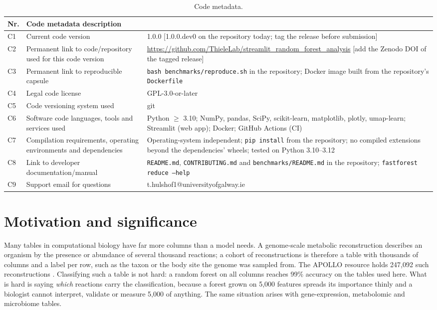 \documentclass[11pt,a4paper]{article}
\newcommand{\authnote}[1]{{\color{notecolor}\small [#1]}}
\begin{document}
\begin{table}[htbp]
\small
\caption{Code metadata.}
\label{tab:metadata}
\begin{tabular}{P{0.6cm}P{6.2cm}P{8.6cm}}
\toprule
\textbf{Nr.} & \textbf{Code metadata description} & \\
\midrule
C1 & Current code version & 1.0.0 \authnote{1.0.0.dev0 on the repository today; tag the release before submission} \\
C2 & Permanent link to code/repository used for this code version & \url{https://github.com/ThieleLab/streamlit_random_forest_analysis} \authnote{add the Zenodo DOI of the tagged release} \\
C3 & Permanent link to reproducible capsule & \texttt{bash benchmarks/reproduce.sh} in the repository; Docker image built from the repository's \texttt{Dockerfile} \\
C4 & Legal code license & GPL-3.0-or-later \\
C5 & Code versioning system used & git \\
C6 & Software code languages, tools and services used & Python $\ge$ 3.10; NumPy, pandas, SciPy, scikit-learn, matplotlib, plotly, umap-learn; Streamlit (web app); Docker; GitHub Actions (CI) \\
C7 & Compilation requirements, operating environments and dependencies & Operating-system independent; \texttt{pip install} from the repository; no compiled extensions beyond the dependencies' wheels; tested on Python 3.10--3.12 \\
C8 & Link to developer documentation/manual & \texttt{README.md}, \texttt{CONTRIBUTING.md} and \texttt{benchmarks/README.md} in the repository; \texttt{fastforest reduce --help} \\
C9 & Support email for questions & t.hulshof1@universityofgalway.ie \\
\bottomrule
\end{tabular}
\end{table}

\section{Motivation and significance}

Many tables in computational biology have far more columns than a model needs. A genome-scale metabolic reconstruction describes an organism by the presence or abundance of several thousand reactions; a cohort of reconstructions is therefore a table with thousands of columns and a label per row, such as the taxon or the body site the genome was sampled from. The APOLLO resource holds 247,092 such reconstructions \cite{heinken2025}. Classifying such a table is not hard: a random forest on all columns reaches 99\% accuracy on the tables used here. What is hard is saying \emph{which} reactions carry the classification, because a forest grown on 5,000 features spreads its importance thinly and a biologist cannot interpret, validate or measure 5,000 of anything. The same situation arises with gene-expression, metabolomic and microbiome tables.
\end{document}
